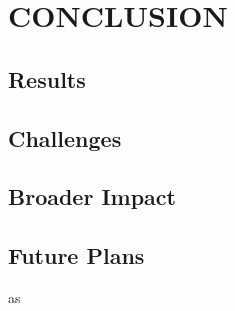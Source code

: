 %
%
%
%



\chapter{CONCLUSION \label{cha:Conclusion}}


\section{Results}

\section{Challenges}

\section{Broader Impact}



\section{Future Plans}
as